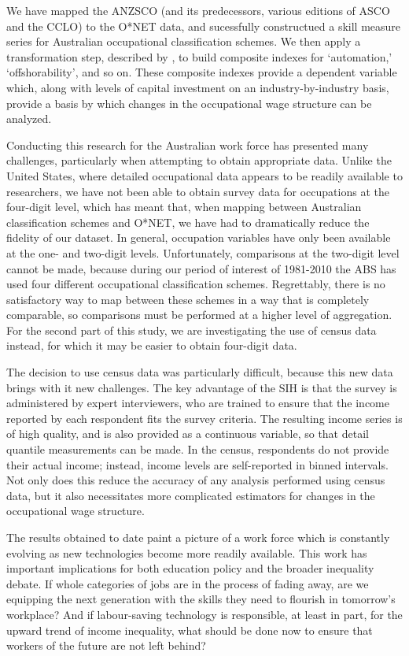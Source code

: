 \documentclass[a4paper,11pt,notitlepage]{article}
\begin{document}
We have mapped the ANZSCO (and its predecessors, various editions of ASCO and the CCLO) to the O*NET data, and sucessfully constructued a skill measure series for Australian occupational classification schemes. We then apply a transformation step, described by \citet{Firpo2011}, to build composite indexes for `automation,' `offshorability', and so on. These composite indexes provide a dependent variable which, along with levels of capital investment on an industry-by-industry basis, provide a basis by which changes in the occupational wage structure can be analyzed.

Conducting this research for the Australian work force has presented many challenges, particularly when attempting to obtain appropriate data. Unlike the United States, where detailed occupational data appears to be readily available to researchers, we have not been able to obtain survey data for occupations at the four-digit level, which has meant that, when mapping between Australian classification schemes and O*NET, we have had to dramatically reduce the fidelity of our dataset. In general, occupation variables have only been available at the one- and two-digit levels. Unfortunately, comparisons at the two-digit level cannot be made, because during our period of interest of 1981-2010 the ABS has used four different occupational classification schemes. Regrettably, there is no satisfactory way to map between these schemes in a way that is completely comparable, so comparisons must be performed at a higher level of aggregation. For the second part of this study, we are investigating the use of census data instead, for which it may be easier to obtain four-digit data. 

The decision to use census data was particularly difficult, because this new data brings with it new challenges. The key advantage of the SIH is that the survey is administered by expert interviewers, who are trained to ensure that the income reported by each respondent fits the survey criteria. The resulting income series is of high quality, and is also provided as a continuous variable, so that detail quantile measurements can be made. In the census, respondents do not provide their actual income; instead, income levels are self-reported in binned intervals. Not only does this reduce the accuracy of any analysis performed using census data, but it also necessitates more complicated estimators for changes in the occupational wage structure.

The results obtained to date paint a picture of a work force which is constantly evolving as new technologies become more readily available. This work has important implications for both education policy and the broader inequality debate. If whole categories of jobs are in the process of fading away, are we equipping the next generation with the skills they need to flourish in tomorrow's workplace? And if labour-saving technology is responsible, at least in part, for the upward trend of income inequality, what should be done now to ensure that workers of the future are not left behind?

\clearpage
\printbibliography
\end{document}
